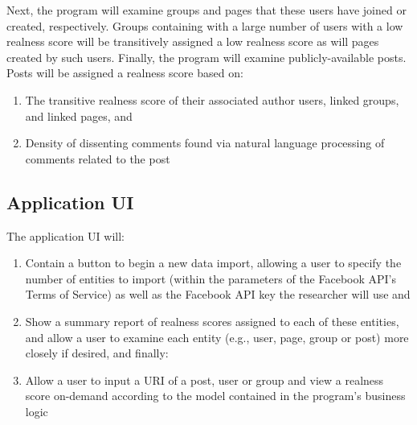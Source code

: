 \documentclass{article}
\begin{document}
Next, the program will examine groups and pages that these users have joined or created, respectively. Groups containing with a large number of users with a low realness score will be transitively assigned a low realness score as will pages created by such users. Finally, the program will examine publicly-available posts. Posts will be assigned a realness score based on:

\begin{enumerate}
\item The transitive realness score of their associated author users, linked groups, and linked pages, and
\item Density of dissenting comments found via natural language processing of comments related to the post
\end{enumerate}

\subsection*{Application UI}

The application UI will:
\begin{enumerate}
\item Contain a button to begin a new data import, allowing a user to specify the number of entities to import (within the parameters of the Facebook API's Terms of Service) as well as the Facebook API key the researcher will use and
\item Show a summary report of realness scores assigned to each of these entities, and allow a user to examine each entity (e.g., user, page, group or post) more closely if desired, and finally:
\item Allow a user to input a URI of a post, user or group and view a realness score on-demand according to the model contained in the program's business logic
\end{enumerate}




\end{document}
